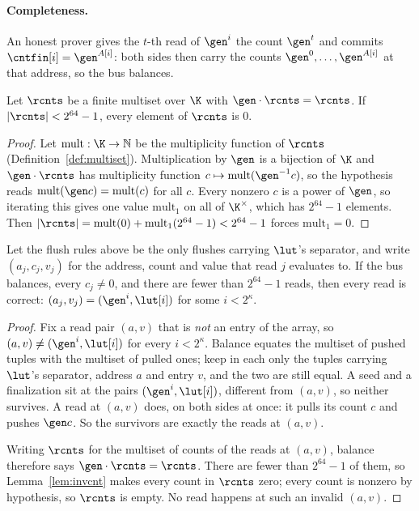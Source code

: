\paragraph{Completeness.} An honest prover gives the $t$-th read of $\gen^{i}$ the count $\gen^{t}$ and commits $\cntfin[i]=\gen^{A[i]}$: both sides then carry the counts $\gen^{0},\dots,\gen^{A[i]}$ at that address, so the bus balances.

\begin{lemma}\label{lem:invcnt}
Let $\rcnts$ be a finite multiset over $\K$ with $\gen\cdot\rcnts=\rcnts$. If $|\rcnts|<2^{64}-1$, every element of $\rcnts$ is $0$.
\end{lemma}

\begin{proof}
Let $\mathrm{mult}:\K\to\mathbb{N}$ be the multiplicity function of $\rcnts$ (Definition~\ref{def:multiset}). Multiplication by $\gen$ is a bijection of $\K$ and $\gen\cdot\rcnts$ has multiplicity function $c\mapsto\mathrm{mult}(\gen^{-1}c)$, so the hypothesis reads $\mathrm{mult}(\gen c)=\mathrm{mult}(c)$ for all $c$. Every nonzero $c$ is a power of $\gen$, so iterating this gives one value $\mathrm{mult}_1$ on all of $\K^{\times}$, which has $2^{64}-1$ elements. Then $|\rcnts|=\mathrm{mult}(0)+\mathrm{mult}_1(2^{64}-1)<2^{64}-1$ forces $\mathrm{mult}_1=0$.
\end{proof}

\begin{theorem}\label{thm:omc}
Let the flush rules above be the only flushes carrying $\lut$'s separator, and write $(a_j,c_j,v_j)$ for the address, count and value that read $j$ evaluates to. If the bus balances, every $c_j\neq0$, and there are fewer than $2^{64}-1$ reads, then every read is correct: $(a_j,v_j)=(\gen^{i},\lut[i])$ for some $i<2^{\kappa}$.
\end{theorem}

\begin{proof}
Fix a read pair $(a,v)$ that is \emph{not} an entry of the array, so $(a,v)\neq(\gen^{i},\lut[i])$ for every $i<2^{\kappa}$. Balance equates the multiset of pushed tuples with the multiset of pulled ones; keep in each only the tuples carrying $\lut$'s separator, address $a$ and entry $v$, and the two are still equal. A seed and a finalization sit at the pairs $(\gen^{i},\lut[i])$, different from $(a,v)$, so neither survives. A read at $(a,v)$ does, on both sides at once: it pulls its count $c$ and pushes $\gen c$. So the survivors are exactly the reads at $(a,v)$.

Writing $\rcnts$ for the multiset of counts of the reads at $(a,v)$, balance therefore says $\gen\cdot\rcnts=\rcnts$. There are fewer than $2^{64}-1$ of them, so Lemma~\ref{lem:invcnt} makes every count in $\rcnts$ zero; every count is nonzero by hypothesis, so $\rcnts$ is empty. No read happens at such an invalid $(a,v)$.

\end{proof}

